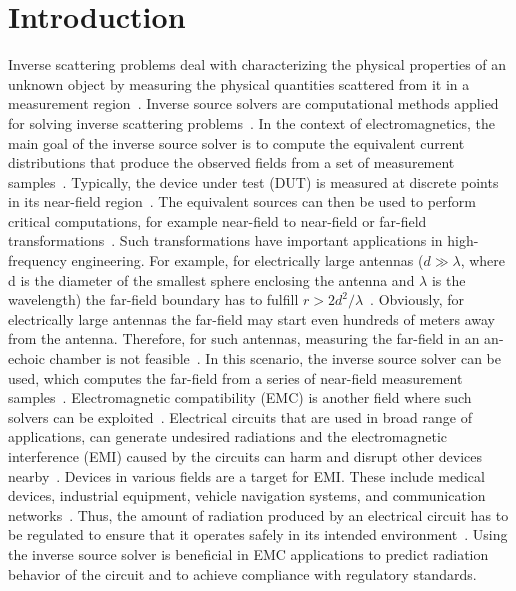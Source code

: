\chapter{Introduction}
Inverse scattering problems deal with characterizing the physical properties of an unknown object by measuring the physical quantities scattered from it in a measurement region~\cite{381063}. Inverse source solvers are computational methods applied for solving inverse scattering problems~\cite{6879330}. In the context of electromagnetics, the main goal of the inverse source solver is to compute the equivalent current distributions that produce the observed fields from a set of measurement samples~\cite{4812237}. Typically, the device under test (DUT) is measured at discrete points in its near-field region~\cite{768793}. The equivalent sources can then be used to perform critical computations, for example near-field to near-field or far-field transformations~\cite{768793}. Such transformations have important applications in high-frequency engineering. For example, for electrically large antennas ($d \gg \lambda$, where d is the diameter of the smallest sphere enclosing the antenna and $\lambda$ is the wavelength) the far-field boundary has to fulfill $r > 2d^2/\lambda$~\cite{balanis}. Obviously, for electrically large antennas the far-field may start even hundreds of meters away from the antenna. Therefore, for such antennas, measuring the far-field in an an-echoic chamber is not feasible~\cite{4812237}. In this scenario, the inverse source solver can be used, which computes the far-field from a series of near-field measurement samples~\cite{4812237}. Electromagnetic compatibility (EMC) is another field where such solvers can be exploited~\cite{6879330}. Electrical circuits that are used in broad range of applications, can generate undesired radiations and the electromagnetic interference (EMI) caused by the circuits can harm and disrupt other devices nearby~\cite{6879330}. Devices in various fields are a target for EMI. These include medical devices, industrial equipment, vehicle navigation systems, and communication networks~\cite{ott}. Thus, the amount of radiation produced by an electrical circuit has to be regulated to ensure that it operates safely in its intended environment~\cite{ott}. Using the inverse source solver is beneficial in EMC applications to predict radiation behavior of the circuit and to achieve compliance with regulatory standards.

